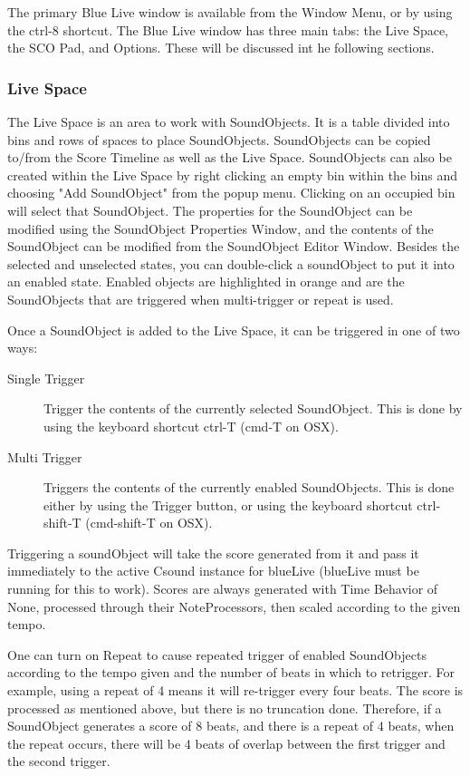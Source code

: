 The primary Blue Live window is available from the Window Menu, or by
using the ctrl-8 shortcut. The Blue Live window has three main tabs: the
Live Space, the SCO Pad, and Options. These will be discussed int he
following sections.

\subsubsection{Live Space}

The Live Space is an area to work with SoundObjects. It is a table
divided into bins and rows of spaces to place SoundObjects. SoundObjects
can be copied to/from the Score Timeline as well as the Live Space.
SoundObjects can also be created within the Live Space by right clicking
an empty bin within the bins and choosing "Add SoundObject" from the
popup menu. Clicking on an occupied bin will select that SoundObject.
The properties for the SoundObject can be modified using the SoundObject
Properties Window, and the contents of the SoundObject can be modified
from the SoundObject Editor Window. Besides the selected and unselected
states, you can double-click a soundObject to put it into an enabled
state. Enabled objects are highlighted in orange and are the
SoundObjects that are triggered when multi-trigger or repeat is used.

Once a SoundObject is added to the Live Space, it can be triggered in
one of two ways:

\begin{description}
\item[Single Trigger]
Trigger the contents of the currently selected SoundObject. This is done
by using the keyboard shortcut ctrl-T (cmd-T on OSX).
\item[Multi Trigger]
Triggers the contents of the currently enabled SoundObjects. This is
done either by using the Trigger button, or using the keyboard shortcut
ctrl-shift-T (cmd-shift-T on OSX).
\end{description}

Triggering a soundObject will take the score generated from it and pass
it immediately to the active Csound instance for blueLive (blueLive must
be running for this to work). Scores are always generated with Time
Behavior of None, processed through their NoteProcessors, then scaled
according to the given tempo.

One can turn on Repeat to cause repeated trigger of enabled SoundObjects
according to the tempo given and the number of beats in which to
retrigger. For example, using a repeat of 4 means it will re-trigger
every four beats. The score is processed as mentioned above, but there
is no truncation done. Therefore, if a SoundObject generates a score of
8 beats, and there is a repeat of 4 beats, when the repeat occurs, there
will be 4 beats of overlap between the first trigger and the second
trigger.

